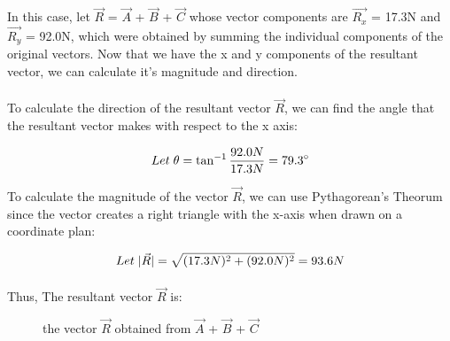 \documentclass[12pt]{article}
\begin{document}
In this case, let $\vec{R}$ = $\vec{A}$ + $\vec{B}$ + $\vec{C}$ whose vector components are $\vec{R_x}$ = 17.3N and $\vec{R_y}$ = 92.0N, which were obtained by summing the individual components of the original vectors. Now that we have the x and y components of the resultant vector, we can calculate it's magnitude and direction.

\paragraph{}

To calculate the direction of the resultant vector $\vec{R}$, we can find the angle that the resultant vector makes with respect to the x axis:

\[Let \thickspace \theta = \tan^{-1}\frac{92.0N}{17.3N} = 79.3^\circ\]

To calculate the magnitude of the vector $\vec{R}$, we can use Pythagorean's Theorum since the vector creates a right triangle with the x-axis when drawn on a coordinate plan:

\[Let \thickspace |\vec{R}|= \sqrt{(17.3N)^2 + (92.0N)^2}=93.6N\]

\paragraph{}

Thus, The resultant vector $\vec{R}$ is:

\begin{figure}[H]
    \centering

    \caption{the vector $\vec{R}$ obtained from $\vec{A}$ + $\vec{B}$ + $\vec{C}$}



\end{figure}
\end{document}
